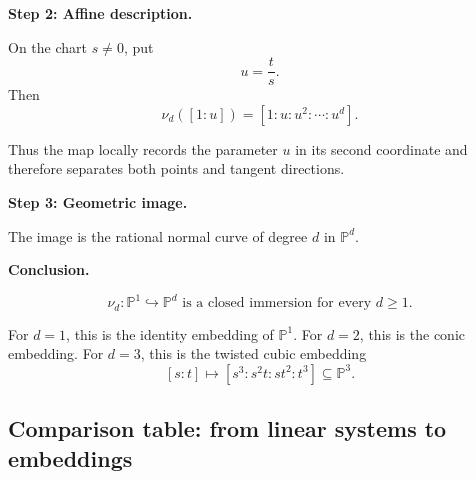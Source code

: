 \documentclass[12pt,a4paper]{article}
\theoremstyle{notespace}
\begin{document}
\textbf{Step 2: Affine description.}

On the chart \(s\neq 0\), put
\[
u=\frac{t}{s}.
\]
Then
\[
\nu_{d}([1:u])
=
[1:u:u^{2}:\cdots:u^{d}].
\]

Thus the map locally records the parameter \(u\) in its second coordinate and therefore separates both points and tangent directions.

\textbf{Step 3: Geometric image.}

The image is the rational normal curve of degree \(d\) in \(\mathbb{P}^{d}\).

\textbf{Conclusion.}

\[
\boxed{
	\nu_{d}:\mathbb{P}^{1}\hookrightarrow \mathbb{P}^{d}
	\text{ is a closed immersion for every }d\geq 1.
}
\]

For \(d=1\), this is the identity embedding of \(\mathbb{P}^{1}\).  
For \(d=2\), this is the conic embedding.  
For \(d=3\), this is the twisted cubic embedding
\[
[s:t]\longmapsto [s^{3}:s^{2}t:st^{2}:t^{3}]
\subseteq \mathbb{P}^{3}.
\]

\subsection{Comparison table: from linear systems to embeddings}
\end{document}
